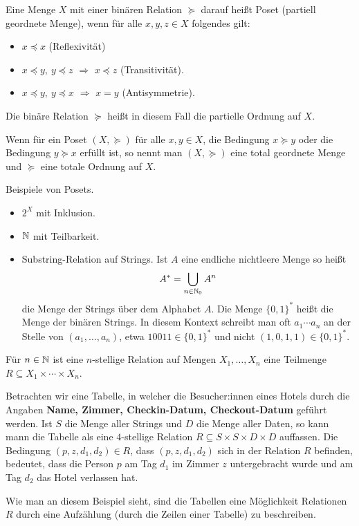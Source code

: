 \begin{defn}
	Eine Menge $X$ mit einer binären Relation $\succeq$ darauf heißt Poset (partiell geordnete Menge), wenn für alle $x,y,z \in X$ folgendes gilt: 
	\begin{itemize}
		\item $x \preceq x$ (Reflexivität)
		\item $x \preceq y, \ y \preceq z$ $\Rightarrow$ $x \preceq z$ (Transitivität). 
		\item $x \preceq y, \ y \preceq x$ $\Rightarrow$ $x = y$ (Antisymmetrie). 
	\end{itemize} 
	Die binäre Relation $\succeq$ heißt in diesem Fall die partielle Ordnung auf $X$. 
\end{defn} 

\begin{defn}
	Wenn für ein Poset $(X,\succeq)$ für alle $x, y \in X$, die Bedingung $x \succeq y$ oder die Bedingung $y \succeq x$ erfüllt ist, so nennt  man $(X,\succeq)$ eine total geordnete Menge und $\succeq$ eine totale Ordnung auf $X$. 
\end{defn} 

\begin{bsp} Beispiele von Posets. 
	\begin{itemize}
		\item $2^X$ mit Inklusion. 
		\item $\mathbb{N}$ mit Teilbarkeit. 
		\item Substring-Relation auf Strings. Ist $A$ eine endliche nichtleere Menge so heißt 
		\[
				A^\ast = \bigcup_{n \in \mathbb{N}_0} A^n
		\]
		die Menge der Strings über dem Alphabet $A$. Die Menge $\{0,1\}^\ast$ heißt die Menge der binären Strings. In diesem Kontext schreibt man oft $a_1 \cdots a_n$ an der Stelle von $(a_1,\ldots,a_n)$, etwa $10011 \in \{0,1\}^\ast$ und nicht $(1,0,1,1) \in \{0,1\}^\ast$. 
	\end{itemize} 
\end{bsp} 

\begin{defn}
	Für $n \in \mathbb{N}$ ist eine $n$-stellige Relation auf Mengen $X_1,\ldots,X_n$ eine Teilmenge $R \subseteq X_1 \times \cdots \times X_n$. 
\end{defn} 

\begin{bsp}
	Betrachten wir eine Tabelle, in welcher die Besucher:innen eines Hotels durch die Angaben \textbf{Name, Zimmer, Checkin-Datum, Checkout-Datum} geführt werden. Ist $S$ die Menge aller Strings und $D$ die Menge aller Daten, so kann mann die Tabelle als eine $4$-stellige Relation  $R \subseteq S \times S \times D \times D$ auffassen. Die Bedingung $(p,z,d_1,d_2) \in R$, dass $(p,z,d_1,d_2)$ sich in der Relation $R$ befinden,  bedeutet, dass die Person $p$ am Tag $d_1$ im Zimmer $z$ untergebracht wurde und am Tag $d_2$ das Hotel verlassen hat. 
	
	Wie man an diesem Beispiel sieht, sind die Tabellen eine Möglichkeit Relationen $R$ durch eine Aufzählung (durch die Zeilen einer Tabelle) zu beschreiben. 
\end{bsp} 


